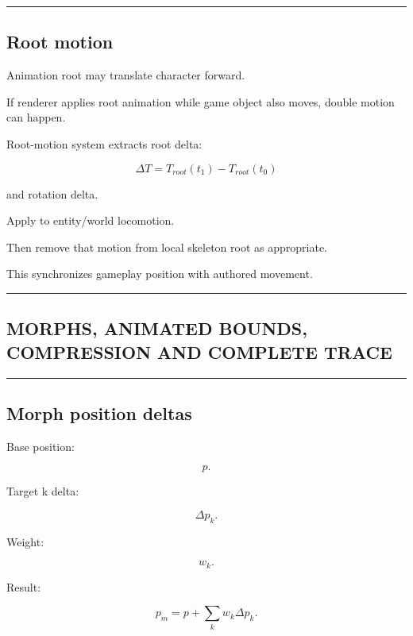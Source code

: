 \begin{center}\rule{0.5\linewidth}{0.5pt}\end{center}

\subsection{Root motion}\label{04-visual-computing-ii-ch041-root-motion}

Animation root may translate character forward.

If renderer applies root animation while game object also moves, double motion can happen.

Root-motion system extracts root delta:

\[
\Delta T=
T_{root}(t_1)
-
T_{root}(t_0)
\]

and rotation delta.

Apply to entity/world locomotion.

Then remove that motion from local skeleton root as appropriate.

This synchronizes gameplay position with authored movement.

\begin{center}\rule{0.5\linewidth}{0.5pt}\end{center}

\subsection{MORPHS, ANIMATED BOUNDS, COMPRESSION AND COMPLETE TRACE}\label{04-visual-computing-ii-ch041-morphs-animated-bounds-compression-and-complete-trace}

\begin{center}\rule{0.5\linewidth}{0.5pt}\end{center}

\subsection{Morph position deltas}\label{04-visual-computing-ii-ch041-morph-position-deltas}

Base position:

\[
p.
\]

Target k delta:

\[
\Delta p_k.
\]

Weight:

\[
w_k.
\]

Result:

\[
\boxed{
p_m
=
p+
\sum_kw_k\Delta p_k.
}
\]

